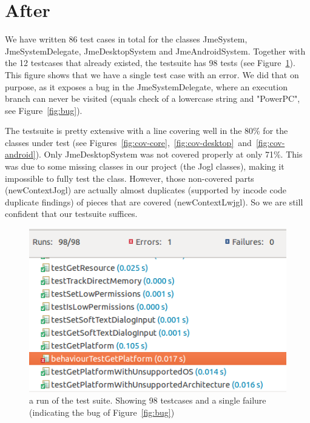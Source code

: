\documentclass[a4paper, 10pt]{article}
\begin{document}
\section{After}
We have written 86 test cases in total for the classes JmeSystem, JmeSystemDelegate, JmeDesktopSystem and JmeAndroidSystem.
Together with the 12 testcases that already existed, the testsuite has 98 tests (see Figure~\ref{fig:num-tests}).
This figure shows that we have a single test case with an error.
We did that on purpose, as it exposes a bug in the JmeSystemDelegate, 
where an execution branch can never be visited (equals check of a lowercase string and "PowerPC", see Figure~\ref{fig:bug}).

The testsuite is pretty extensive with a line covering well in the 80\% for the classes under test (see Figures~\ref{fig:cov-core},~\ref{fig:cov-desktop}~and~\ref{fig:cov-android}).
Only JmeDesktopSystem was not covered properly at only 71\%. 
This was due to some missing classes in our project (the Jogl classes),
making it impossible to fully test the class. 
However, those non-covered parts (newContextJogl) are actually almost duplicates (supported by incode code duplicate findings) of pieces that are covered (newContextLwjgl).
So we are still confident that our testsuite suffices.

\begin{figure}
\includegraphics[width=\textwidth]{figures/86-new-tests.png}
\caption{a run of the test suite. Showing 98 testcases and a single failure (indicating the bug of Figure~\ref{fig:bug})}
\label{fig:num-tests}
\end{figure}
\end{document}
